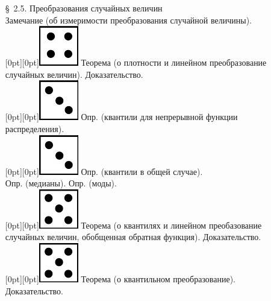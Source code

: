 \documentclass[10pt]{amsart}
\begin{document}
\begin{enumerate}
\begin{enumerate}
\item[\S\, 2.5.] Преобразования случайных величин \\
Замечание (об измеримости преобразования случайной величины). \\
 \raisebox{-1pt}[0pt][0pt]{\includegraphics[width=0.02\linewidth]{4.png}} Теорема (о плотности и линейном преобразование случайных величин). Доказательство. \\
 \raisebox{-1pt}[0pt][0pt]{\includegraphics[width=0.02\linewidth]{3.png}}   Опр. (квантили для непрерывной функции распределения). \\
 \raisebox{-1pt}[0pt][0pt]{\includegraphics[width=0.02\linewidth]{3.png}}   Опр. (квантили в общей случае). \\
Опр. (медианы).   Опр. (моды). \\
 \raisebox{-1pt}[0pt][0pt]{\includegraphics[width=0.02\linewidth]{5.png}}   Теорема (о квантилях и линейном преобазование случайных величин, обобщенная обратная функция). Доказательство. \\
 \raisebox{-1pt}[0pt][0pt]{\includegraphics[width=0.02\linewidth]{5.png}}  Теорема (о квантильном преобразование). Доказательство. \\


\end{enumerate}
\end{enumerate}
\end{document}
